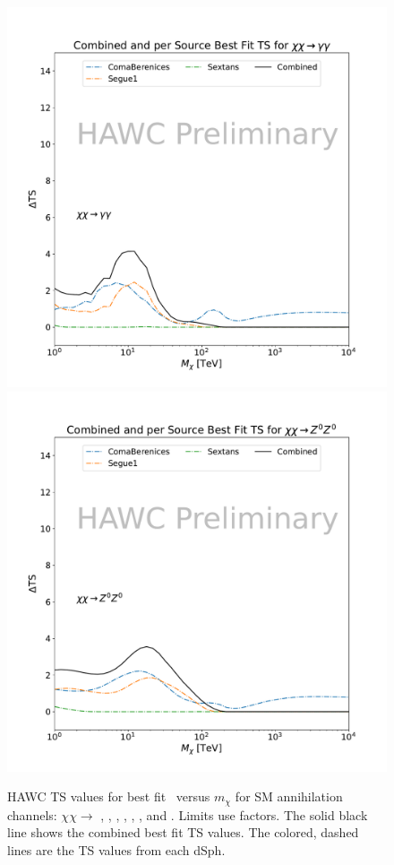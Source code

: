 \begin{figure}[h]
{    \includegraphics[scale=0.21]{figures/mtd_hawc_dm/results/CombinedTS_New_duck_gammagamma_.pdf}
    \includegraphics[scale=0.21]{figures/mtd_hawc_dm/results/CombinedTS_New_duck_zz_.pdf}
    }
    \caption{HAWC TS values for best fit \sv~versus $m_\chi$ for SM annihilation channels: $\chi\chi \rightarrow $ , \parpar{\nu_\mu}, \parpar{\nu_\tau}, , \parpar{\mu}, \parpar{\tau}, \pp{\gamma} and . Limits use \LS \J factors. The solid black line shows the combined best fit TS values. The colored, dashed lines are the TS values from each dSph.}
\label{fig:mtd_TS_2of2}
\end{figure}

